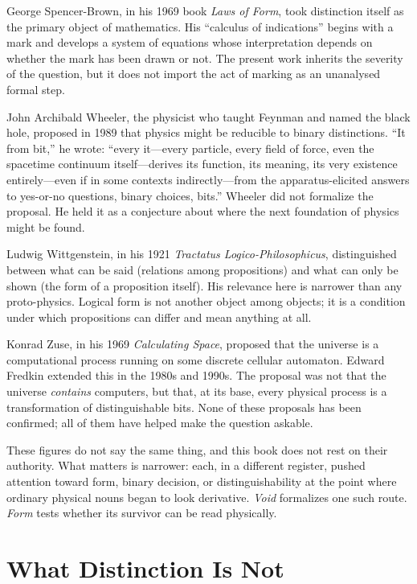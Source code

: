 \documentclass[11pt,a4paper]{book}
\begin{document}
George Spencer-Brown, in his 1969 book \textit{Laws of Form}, took distinction itself as the primary object of mathematics. His ``calculus of indications'' begins with a mark and develops a system of equations whose interpretation depends on whether the mark has been drawn or not. The present work inherits the severity of the question, but it does not import the act of marking as an unanalysed formal step.

John Archibald Wheeler, the physicist who taught Feynman and named the black hole, proposed in 1989 that physics might be reducible to binary distinctions. ``It from bit,'' he wrote: ``every it---every particle, every field of force, even the spacetime continuum itself---derives its function, its meaning, its very existence entirely---even if in some contexts indirectly---from the apparatus-elicited answers to yes-or-no questions, binary choices, bits.'' Wheeler did not formalize the proposal. He held it as a conjecture about where the next foundation of physics might be found.

Ludwig Wittgenstein, in his 1921 \textit{Tractatus Logico-Philosophicus}, distinguished between what can be said (relations among propositions) and what can only be shown (the form of a proposition itself). His relevance here is narrower than any proto-physics. Logical form is not another object among objects; it is a condition under which propositions can differ and mean anything at all.

Konrad Zuse, in his 1969 \textit{Calculating Space}, proposed that the universe is a computational process running on some discrete cellular automaton. Edward Fredkin extended this in the 1980s and 1990s. The proposal was not that the universe \emph{contains} computers, but that, at its base, every physical process is a transformation of distinguishable bits. None of these proposals has been confirmed; all of them have helped make the question askable.

These figures do not say the same thing, and this book does not rest on their authority. What matters is narrower: each, in a different register, pushed attention toward form, binary decision, or distinguishability at the point where ordinary physical nouns began to look derivative. \textit{Void} formalizes one such route. \textit{Form} tests whether its survivor can be read physically.

\section*{What Distinction Is Not}
\end{document}
